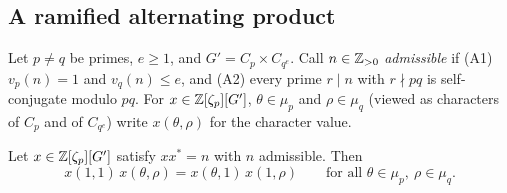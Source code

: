 \subsection{A ramified alternating product}\label{ssec:B}
Let $p\ne q$ be primes, $e\ge1$, and $G'=C_p\times C_{q^e}$. Call
$n\in\mathbb{Z}_{>0}$ \emph{admissible} if (A1) $v_p(n)=1$ and $v_q(n)\le e$, and
(A2) every prime $r\mid n$ with $r\nmid pq$ is self-conjugate modulo
$pq$. For $x\in\mathbb{Z}[\zeta_p][G']$, $\theta\in\mu_p$ and $\rho\in\mu_q$
(viewed as characters of $C_p$ and of $C_{q^e}$) write $x(\theta,\rho)$
for the character value.

\begin{theorem}\label{thm:B}
Let $x\in\mathbb{Z}[\zeta_p][G']$ satisfy $xx^*=n$ with $n$ admissible. Then
\[
 x(1,1)\,x(\theta,\rho)=x(\theta,1)\,x(1,\rho)\qquad\text{for all }
 \theta\in\mu_p,\ \rho\in\mu_q .
\]
\end{theorem}

